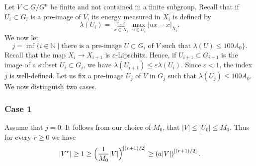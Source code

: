 \documentclass[11pt]{article}
\theoremstyle{plain}
\theoremstyle{definition}
\begin{document}
Let $V\subset G/G^n$ be finite and not contained in a finite subgroup.
Recall that if $U_i \subset G_i$ is a pre-image of $V$, its energy measured in $X_i$ is defined by
\begin{equation*}
\lambda(U_i)= \inf_{x\in X_i} \max_{u\in U_i} |ux-x|_{X_i}.
\end{equation*}
We now let
\begin{equation}
\label{eqn: choose j}
j=\inf\{ i \in \mathbb N \mid \text{there is a pre-image $U \subset G_i$ of $V$ such that } \lambda(U)\leqslant 100 A_0\}.
\end{equation}
Recall that the map $X_i \to X_{i+1}$ is $\varepsilon$-Lipschitz.
Hence, if $U_{i+1} \subset G_{i+1}$ is the image of a subset $U_i \subset G_i$, we have $\lambda(U_{i+1}) \leqslant \varepsilon \lambda (U_i)$.
Since $\varepsilon < 1$, the index $j$ is well-defined.
Let us fix a pre-image $U_j$ of $V$ in $G_j$ such that $\lambda(U_j)\leqslant 100 A_0$.
We now distinguish two cases.

\subsubsection*{Case 1}
Assume that $j = 0$.
It follows from our choice of $M_0$, that $|V | \leq |U_0| \leq M_0$.
Thus for every $r \geq 0$ we have
\begin{equation*}
|V^r|
\geq 1
\geq \Bigl(\frac 1{M_0} |V|\Bigr)^{[(r+1)/2]}
\geq \left(a |V|\right)^{[(r+1)/2]}.
\end{equation*}
\end{document}
